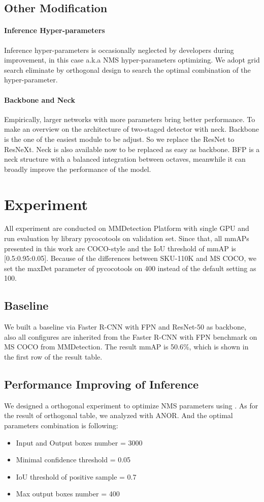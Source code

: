 \documentclass{article}
\begin{document}
\subsection{Other Modification}
\paragraph{Inference Hyper-parameters} Inference hyper-parameters is occasionally neglected by developers during improvement, in this case a.k.a NMS hyper-parameters optimizing. We adopt grid search eliminate by orthogonal design to search the optimal combination of the hyper-parameter.
\paragraph{Backbone and Neck} Empirically, larger networks with more parameters bring better performance. To make an overview on the architecture of two-staged detector with neck. Backbone is the one of the easiest module to be adjust. So we replace the ResNet to ResNeXt\cite{resnext}. Neck is also available now to be replaced as easy as backbone. BFP\cite{bfp} is a neck structure with a balanced integration between octaves, meanwhile it can broadly improve the performance of the model. 

\section{Experiment}
All experiment are conducted on MMDetection Platform with single GPU and run evaluation by library pycocotools on validation set. Since that, all mmAPs presented in this work are COCO-style and the IoU threshold of mmAP is [0.5:0.95:0.05]. Because of the differences between SKU-110K and MS COCO, we set the maxDet parameter of pycocotools on 400 instead of the default setting as 100.
\subsection{Baseline}
We built a baseline via Faster R-CNN\cite{faster} with FPN\cite{fpn} and ResNet-50\cite{resnet} as backbone, also all configures are inherited from the Faster R-CNN with FPN benchmark on MS COCO from MMDetection\cite{mmdet}. The result mmAP is 50.6\%, which is shown in the first row of the result table.
\subsection{Performance Improving of Inference}
We designed a orthogonal experiment to optimize NMS parameters using . As for the result of orthogonal table, we analyzed with ANOR. And the optimal parameters combination is following:
\begin{itemize}
    \item Input and Output boxes number = 3000
    \item Minimal confidence threshold = 0.05
    \item IoU threshold of positive sample = 0.7
    \item Max output boxes number = 400
\end{itemize}
\end{document}
